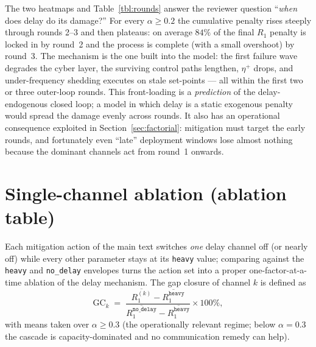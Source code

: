 \documentclass[a4paper,fleqn]{cas-dc}
\newcommand{\Rone}{R_1}
\newcommand{\nodelay}{\texttt{no\_delay}}
\begin{document}
The two heatmaps and Table~\ref{tbl:rounds} answer the reviewer question
``\emph{when} does delay do its damage?''  For every $\alpha\ge0.2$ the
cumulative penalty rises steeply through rounds 2--3 and then plateaus: on
average $84\%$ of the final $\Rone$ penalty is locked in by round~2 and the
process is complete (with a small overshoot) by round~3.  The mechanism is
the one built into the model: the first failure wave degrades the cyber
layer, the surviving control paths lengthen, $\eta^{+}$ drops, and
under-frequency shedding executes on stale set-points --- all within the
first two or three outer-loop rounds.  This front-loading is a
\emph{prediction} of the delay-endogenous closed loop; a model in which
delay is a static exogenous penalty would spread the damage evenly across
rounds.  It also has an operational consequence exploited in
Section~\ref{sec:factorial}: mitigation must target the early rounds, and
fortunately even ``late'' deployment windows lose almost nothing because the
dominant channels act from round~1 onwards.

\section{Single-channel ablation (ablation table)}\label{sec:ablation}

Each mitigation action of the main text switches \emph{one} delay channel
off (or nearly off) while every other parameter stays at its \texttt{heavy}
value; comparing against the \texttt{heavy} and \nodelay{} envelopes turns
the action set into a proper one-factor-at-a-time ablation of the delay
mechanism.  The gap closure of channel $k$ is defined as
\begin{equation}
\mathrm{GC}_k \;=\;
\frac{\overline{R_1^{(k)}}-\overline{R_1^{\texttt{heavy}}}}
     {\overline{R_1^{\nodelay{}}}-\overline{R_1^{\texttt{heavy}}}}
\times 100\%,
\end{equation}
with means taken over $\alpha\ge0.3$ (the operationally relevant regime;
below $\alpha=0.3$ the cascade is capacity-dominated and no communication
remedy can help).
\end{document}
